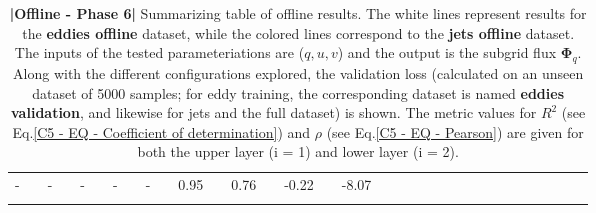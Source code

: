 \begin{table}[H]
\begin{tabular}{llclclclclclclclclclclclclclclcl}
-     		&  & -               &  & -            &   & -                                          &  &  -           &  & 0.95      &  & 0.76      &  & -0.22    &  & -8.07             \\ [0.4em]
\Xhline{1.5pt}\\[-0.8em]      
\end{tabular}
\caption{\textbf{|}\textcolor{section_color}{\textbf{Offline - Phase 6}}\textbf{|} Summarizing table of offline results. The white lines represent results for the \textbf{eddies offline} dataset, while the colored lines correspond to the \textbf{jets offline} dataset. The inputs of the tested parameteriations are ($q, u, v$) and the output is the subgrid flux $\mathbf{\Phi}_q$. Along with the different configurations explored, the validation loss (calculated on an unseen dataset of 5000 samples; for eddy training, the corresponding dataset is named \textbf{eddies validation}, and likewise for jets and the full dataset) is shown. The metric values for $R^2$ (see Eq.\ref{C5 - EQ - Coefficient of determination}) and $\rho$ (see Eq.\ref{C5 - EQ - Pearson}) are given for both the upper layer (i = 1) and lower layer (i = 2).}
\label{C5 - TAB - PHASE 6}
\end{table}
\bgroup
